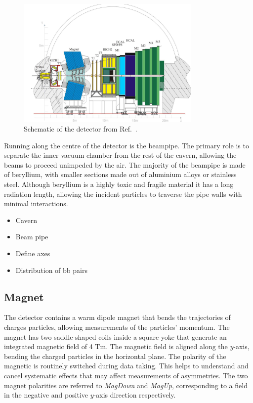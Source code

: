 \begin{figure}[!h]
    \centering
    \includegraphics[width=0.8\textwidth]{figs/Detector/LHCb_Detector_Schematic.pdf}
    \caption{Schematic of the \lhcb detector from Ref.~\cite{Alves:2008zz}.}
    \label{fig:Dec_lhcb_Schematic}   
\end{figure}



Running along the centre of the detector is the \lhcb beampipe. The primary role is to separate the inner vacuum chamber from the rest of the cavern, allowing the beams to proceed unimpeded by the air. The majority of the beampipe is made of beryllium, with smaller sections made out of aluminium alloys or stainless steel. Although beryllium is a highly toxic and fragile material it has a long radiation length, allowing the incident particles to traverse the pipe walls with minimal interactions.  


{\color{Red}
\begin{itemize}
\item Cavern
\item Beam pipe
\item Define axes 
\end{itemize}
}

{\color{Green}
\begin{itemize}
\item Distribution of bb pairs
\end{itemize}
}

\subsection{Magnet}

The \lhcb detector contains a warm dipole magnet that bends the trajectories of charges particles, allowing measurements of the particles' momentum. The magnet has two saddle-shaped coils inside a square yoke that generate an integrated magnetic field of 4 Tm.  
The magnetic field is aligned along the $y$-axis, bending the charged particles in the horizontal plane. The polarity of the magnetic is routinely switched during data taking. This helps to understand and cancel systematic effects that may affect measurements of \CP asymmetries. The two magnet polarities are referred to \emph{MagDown} and \emph{MagUp}, corresponding to a field in the negative and positive $y$-axis direction respectively.   

